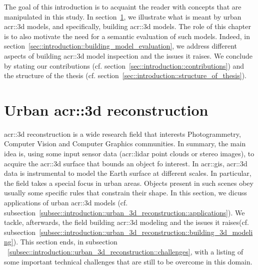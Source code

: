 \minitoc

\phantom{M}

The goal of this introduction is to acquaint the reader with concepts that are manipulated in this study.
In section~\ref{sec::introduction::urban_3d_reconstruction}, we illustrate what is meant by urban \gls{acr::3d} models, and specifically,  building \gls{acr::3d} models.
The role of this chapter is to also motivate the need for a semantic evaluation of such models.
Indeed, in section~\ref{sec::introduction::building_model_evaluation}, we address different aspects of building \gls{acr::3d} model inspection and the issues it raises.
We conclude by stating our contributions (cf. section~\ref{sec::introduction::contributions}) and the structure of the thesis (cf. section~\ref{sec::introduction::structure_of_thesis}).

\clearpage

\section{Urban \gls{acr::3d} reconstruction}
    \label{sec::introduction::urban_3d_reconstruction}
    \gls{acr::3d} reconstruction is a wide research field that interests Photogrammetry, Computer Vision and Computer Graphics communities.
    In summary, the main idea is, using some input sensor data (\gls{acr::lidar} point clouds or stereo images), to acquire the \gls{acr::3d} surface that bounds an object fo interest.
    In \gls{acr::gis}, \gls{acr::3d} data is instrumental to model the Earth surface at different scales.
    In particular, the field takes a special focus in urban areas.
    Objects present in such scenes obey usually some specific rules that constrain their shape.
    In this section, we dicuss applications of urban \gls{acr::3d} models (cf. subsection~\ref{subsec::introduction::urban_3d_reconstruction::applications}).
    We tackle, afterwards, the field  building \gls{acr::3d} modeling and the issues it raises(cf. subsection~\ref{subsec::introduction::urban_3d_reconstruction::building_3d_modeling}).
    This section ends, in subsection ~\ref{subsec::introduction::urban_3d_reconstruction::challenges}, with a listing of some important technical challenges that are still to be overcome in this domain.

